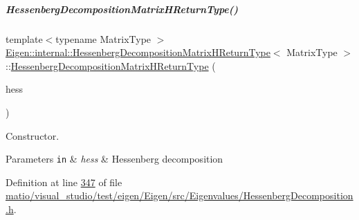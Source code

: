 \mbox{\label{group___eigenvalues___module_aa6d46d84c1343c964c50457ca4ddf9fa}} 
\subparagraph{\texorpdfstring{Hessenberg\+Decomposition\+Matrix\+H\+Return\+Type()}{HessenbergDecompositionMatrixHReturnType()}\hspace{0.1cm}{\footnotesize\ttfamily [2/2]}}
{\footnotesize\ttfamily template$<$typename Matrix\+Type $>$ \\
\hyperlink{group___eigenvalues___module_struct_eigen_1_1internal_1_1_hessenberg_decomposition_matrix_h_return_type}{Eigen\+::internal\+::\+Hessenberg\+Decomposition\+Matrix\+H\+Return\+Type}$<$ Matrix\+Type $>$\+::\hyperlink{group___eigenvalues___module_struct_eigen_1_1internal_1_1_hessenberg_decomposition_matrix_h_return_type}{Hessenberg\+Decomposition\+Matrix\+H\+Return\+Type} (\begin{DoxyParamCaption}\item[{const \hyperlink{group___eigenvalues___module_class_eigen_1_1_hessenberg_decomposition}{Hessenberg\+Decomposition}$<$ Matrix\+Type $>$ \&}]{hess }\end{DoxyParamCaption})\hspace{0.3cm}{\ttfamily [inline]}}



Constructor. 


\begin{DoxyParams}[1]{Parameters}
\mbox{\tt in}  & {\em hess} & Hessenberg decomposition \\
\hline
\end{DoxyParams}


Definition at line \hyperlink{matio_2visual__studio_2test_2eigen_2_eigen_2src_2_eigenvalues_2_hessenberg_decomposition_8h_source_l00347}{347} of file \hyperlink{matio_2visual__studio_2test_2eigen_2_eigen_2src_2_eigenvalues_2_hessenberg_decomposition_8h_source}{matio/visual\+\_\+studio/test/eigen/\+Eigen/src/\+Eigenvalues/\+Hessenberg\+Decomposition.\+h}.



